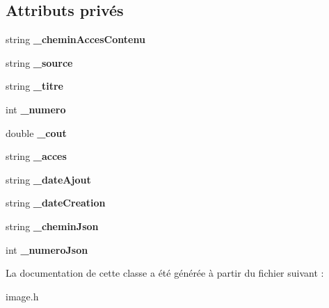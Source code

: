 \subsection*{Attributs privés}
\begin{DoxyCompactItemize}
\item 
\mbox{\label{classImage_a5be79dfb07e3c7034b3571b3de1b41b3}} 
string {\bfseries \+\_\+chemin\+Acces\+Contenu}
\item 
\mbox{\label{classImage_a334d684791301ed30235b27fdbda08bc}} 
string {\bfseries \+\_\+source}
\item 
\mbox{\label{classImage_af333a359e64cff852303bd8a3430d1f9}} 
string {\bfseries \+\_\+titre}
\item 
\mbox{\label{classImage_a10da628a91912101d1881b8584b8ad09}} 
int {\bfseries \+\_\+numero}
\item 
\mbox{\label{classImage_a59e12fc03a9abd32b5ce33f6e578dbcb}} 
double {\bfseries \+\_\+cout}
\item 
\mbox{\label{classImage_ad1d6a130886741fd6e717a2f1da8e721}} 
string {\bfseries \+\_\+acces}
\item 
\mbox{\label{classImage_a8aec5a72b3f46374c9539ed588e32b19}} 
string {\bfseries \+\_\+date\+Ajout}
\item 
\mbox{\label{classImage_a58d288867ea74e64a67a41ff411bf4db}} 
string {\bfseries \+\_\+date\+Creation}
\item 
\mbox{\label{classImage_ab4a0d26bfcc93abe3d220b249a9aab8d}} 
string {\bfseries \+\_\+chemin\+Json}
\item 
\mbox{\label{classImage_a6c2d2791e7de797247cdd58656960504}} 
int {\bfseries \+\_\+numero\+Json}
\end{DoxyCompactItemize}


La documentation de cette classe a été générée à partir du fichier suivant \+:\begin{DoxyCompactItemize}
\item 
image.\+h\end{DoxyCompactItemize}
